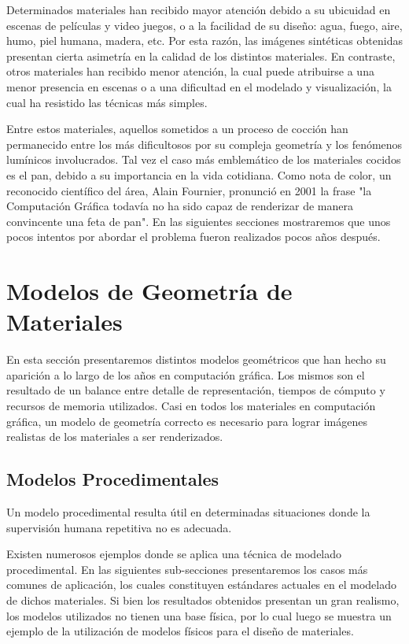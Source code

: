 Determinados materiales han recibido mayor atención debido a su ubicuidad en escenas de películas y video juegos, o a la facilidad de su diseño: agua, fuego, aire, humo, piel humana, madera, etc. Por esta razón, las imágenes sintéticas obtenidas presentan cierta asimetría en la calidad de los distintos materiales. En contraste, otros materiales han recibido menor atención, la cual puede atribuirse a una menor presencia en escenas o a una dificultad en el modelado y visualización, la cual ha resistido las técnicas más simples.

Entre estos materiales, aquellos sometidos a un proceso de cocción han permanecido entre los más dificultosos por su compleja geometría y los fenómenos lumínicos involucrados. Tal vez el caso más emblemático de los materiales cocidos es el pan, debido a su importancia en la vida cotidiana. Como nota de color, un reconocido  científico del área, Alain Fournier, pronunció en 2001 la frase "la Computación Gráfica todavía no ha sido capaz de renderizar de manera convincente una feta de pan". En las siguientes secciones mostraremos que unos pocos intentos por abordar el problema fueron realizados pocos años después.

\section{Modelos de Geometría de Materiales}
En esta sección presentaremos distintos modelos geométricos que han hecho su aparición a lo largo de los años en computación gráfica.
Los mismos son el resultado de un balance entre detalle de representación, tiempos de cómputo y recursos de memoria utilizados.
Casi en todos los materiales en computación gráfica, un modelo de geometría correcto es necesario para lograr imágenes realistas de los materiales a ser renderizados.

\subsection{Modelos Procedimentales}
Un modelo procedimental resulta útil en determinadas situaciones donde la supervisión humana repetitiva no es adecuada.

Existen numerosos ejemplos donde se aplica una técnica de modelado procedimental.
En las siguientes sub-secciones presentaremos los casos más comunes de aplicación, los cuales constituyen estándares actuales en el modelado de dichos materiales.
Si bien los resultados obtenidos presentan un gran realismo, los modelos utilizados no tienen una base física, por lo cual luego se muestra un ejemplo de la utilización de modelos físicos para el diseño de materiales.


